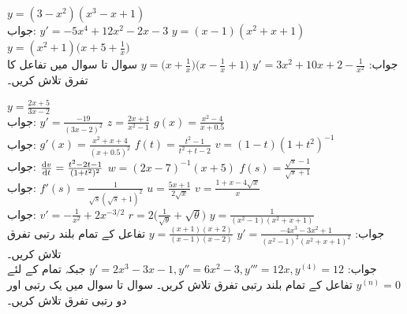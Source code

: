 $y=(3-x^2)(x^3-x+1)$\\
جواب:\quad
$y'=-5x^4+12x^2-2x-3$
$y=(x-1)(x^2+x+1)$
$y=(x^2+1)\big(x+5+\tfrac{1}{x}\big)$\\
جواب:\quad
$y'=3x^2+10x+2-\tfrac{1}{x^2}$
$y=\big(x+\tfrac{1}{x}\big)\big(x-\tfrac{1}{x}+1\big)$
سوال  تا سوال  میں تفاعل کا تفرق تلاش کریں۔

$y=\tfrac{2x+5}{3x-2}$\\
جواب:\quad
$y'=\tfrac{-19}{(3x-2)^2}$
$z=\tfrac{2x+1}{x^2-1}$
$g(x)=\tfrac{x^2-4}{x+0.5}$\\
جواب:\quad
$g'(x)=\tfrac{x^2+x+4}{(x+0.5)^2}$
$f(t)=\tfrac{t^2-1}{t^2+t-2}$
$v=(1-t)(1+t^2)^{-1}$\\
جواب:\quad
$\tfrac{\dif v}{\dif t}=\tfrac{t^2-2t-1}{(1+t^2)^2}$
$w=(2x-7)^{-1}(x+5)$
$f(s)=\tfrac{\sqrt{s}-1}{\sqrt{s}+1}$\\
جواب:\quad
$f'(s)=\tfrac{1}{\sqrt{s}(\sqrt{s}+1)^2}$
$u=\tfrac{5x+1}{2\sqrt{x}}$
$v=\tfrac{1+x-4\sqrt{x}}{x}$\\
جواب:\quad
$v'=-\tfrac{1}{x^2}+2x^{-3/2}$
$r=2\big(\tfrac{1}{\sqrt{\theta}}+\sqrt{\theta}\big)$
$y=\tfrac{1}{(x^2-1)(x^2+x+1)}$\\
جواب:\quad
$y'=\tfrac{-4x^3-3x^2+1}{(x^2-1)^2(x^2+x+1)^2}$
$y=\tfrac{(x+1)(x+2)}{(x-1)(x-2)}$
تفاعل  کے تمام بلند رتبی تفرق تلاش کریں۔\\
جواب:\quad
$y'=2x^3-3x-1, y''=6x^2-3,y'''=12x, y^{(4)}=12$
جبکہ تمام  کے لئے 
$y^{(n)}=0$
تفاعل  کے تمام بلند رتبی تفرق تلاش کریں۔
سوال  تا سوال  میں یک رتبی اور دو رتبی تفرق تلاش کریں۔


